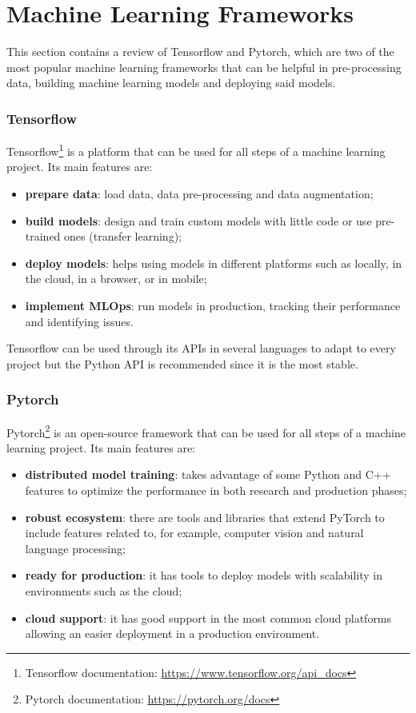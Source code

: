 
\section{Machine Learning Frameworks}

This section contains a review of Tensorflow and Pytorch, which are two of the most popular machine learning frameworks that can be helpful in pre-processing data, building machine learning models and deploying said models.

\subsubsection{Tensorflow}

Tensorflow\footnote{Tensorflow documentation: \url{https://www.tensorflow.org/api_docs}} is a platform that can be used for all steps of a machine learning project. Its main features are:
\begin{itemize}
    \item \textbf{prepare data}: load data, data pre-processing and data augmentation;
    \item \textbf{build models}: design and train custom models with little code or use pre-trained ones (transfer learning);
    \item \textbf{deploy models}: helps using models in different platforms such as locally, in the cloud, in a browser, or in mobile;
    \item \textbf{implement MLOps}: run models in production, tracking their performance and identifying issues.
\end{itemize}

Tensorflow can be used through its APIs in several languages to adapt to every project but the Python API is recommended since it is the most stable.

\subsubsection{Pytorch}

Pytorch\footnote{Pytorch documentation: \url{https://pytorch.org/docs}} is an open-source framework that can be used for all steps of a machine learning project. Its main features are:

\begin{itemize}
    \item \textbf{distributed model training}: takes advantage of some Python and C++ features to optimize the performance in both research and production phases;
    \item \textbf{robust ecosystem}: there are tools and libraries that extend PyTorch to include features related to, for example, computer vision and natural language processing;
    \item \textbf{ready for production}: it has tools to deploy models with scalability in environments such as the cloud;
    \item \textbf{cloud support}: it has good support in the most common cloud platforms allowing an easier deployment in a production environment.
\end{itemize}

